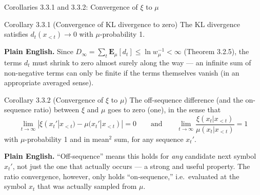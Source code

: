 \documentclass[aspectratio=169,10pt]{beamer}
\begin{document}
\begin{frame}{Corollaries 3.3.1 and 3.3.2: Convergence of $\xi$ to $\mu$}
  \begin{block}{Corollary 3.3.1 (Convergence of KL divergence to zero)}
    The KL divergence satisfies $d_t(x_{<t}) \to 0$ with $\mu$-probability 1.
  \end{block}
  \textbf{Plain English.} Since $D_\infty=\sum_t \mathbf{E}_\mu[d_t]\le\ln w_\mu^{-1}<\infty$
  (Theorem 3.2.5), the terms $d_t$ must shrink to zero almost surely along
  the way --- an infinite sum of non-negative terms can only be finite if the
  terms themselves vanish (in an appropriate averaged sense).

  \begin{block}{Corollary 3.3.2 (Convergence of $\xi$ to $\mu$)}
    The off-sequence difference (and the on-sequence ratio) between $\xi$ and
    $\mu$ goes to zero (one), in the sense that
    \[
      \lim_{t\to\infty} |\xi(x_t'|x_{<t}) - \mu(x_t'|x_{<t})| = 0
      \qquad\text{and}\qquad
      \lim_{t\to\infty} \frac{\xi(x_t|x_{<t})}{\mu(x_t|x_{<t})} = 1
    \]
    with $\mu$-probability 1 and in mean$^2$ sum, for any sequence $x_t'$.
  \end{block}
  \textbf{Plain English.} ``Off-sequence'' means this holds for \emph{any}
  candidate next symbol $x_t'$, not just the one that actually occurs ---
  a strong and useful property. The ratio convergence, however, only holds
  ``on-sequence,'' i.e.\ evaluated at the symbol $x_t$ that was actually
  sampled from $\mu$.
\end{frame}
\end{document}
